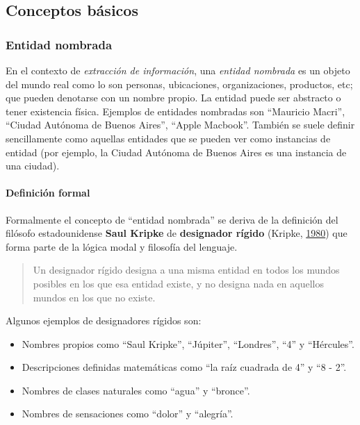 \documentclass[12pt,a4paper,]{scrartcl}
\providecommand{\tightlist}{%
  \setlength{\itemsep}{0pt}\setlength{\parskip}{0pt}}
\let\oldparagraph\paragraph
\renewcommand{\paragraph}[1]{\oldparagraph{#1}\mbox{}}
\begin{document}
\hypertarget{conceptos-buxe1sicos}{%
\subsection{Conceptos básicos}\label{conceptos-buxe1sicos}}

\hypertarget{entidad-nombrada}{%
\subsubsection{Entidad nombrada}\label{entidad-nombrada}}

En el contexto de \emph{extracción de información}, una \emph{entidad nombrada} es un objeto del mundo real como lo son personas, ubicaciones, organizaciones, productos, etc; que pueden denotarse con un nombre propio. La entidad puede ser abstracto o tener existencia física. Ejemplos de entidades nombradas son \enquote{Mauricio Macri}, \enquote{Ciudad Autónoma de Buenos Aires}, \enquote{Apple Macbook}.
También se suele definir sencillamente como aquellas entidades que se pueden ver como instancias de entidad (por ejemplo, la Ciudad Autónoma de Buenos Aires es una instancia de una ciudad).

\hypertarget{definiciuxf3n-formal}{%
\paragraph{Definición formal}\label{definiciuxf3n-formal}}

Formalmente el concepto de \enquote{entidad nombrada} se deriva de la definición del filósofo estadounidense \textbf{Saul Kripke} de \textbf{designador rígido} (Kripke, \protect\hyperlink{ref-kripke1980naming}{1980}) que forma parte de la lógica modal y filosofía del lenguaje.

\begin{quote}
Un designador rígido designa a una misma entidad en todos los mundos posibles en los que esa entidad existe, y no designa nada en aquellos mundos en los que no existe.
\end{quote}

Algunos ejemplos de designadores rígidos son:

\begin{itemize}
\tightlist
\item
  Nombres propios como \enquote{Saul Kripke}, \enquote{Júpiter}, \enquote{Londres}, \enquote{4} y \enquote{Hércules}.
\item
  Descripciones definidas matemáticas como \enquote{la raíz cuadrada de 4} y \enquote{8 - 2}.
\item
  Nombres de clases naturales como \enquote{agua} y \enquote{bronce}.
\item
  Nombres de sensaciones como \enquote{dolor} y \enquote{alegría}.
\end{itemize}
\end{document}
